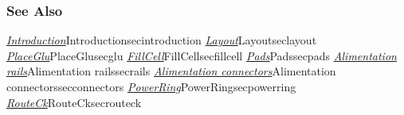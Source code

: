\subsubsection{See Also}

\hyperref[ref]{\emph{Introduction}}{}{Introduction}{secintroduction}
\hyperref[ref]{\emph{Layout}}{}{Layout}{seclayout}
\hyperref[ref]{\emph{PlaceGlu}}{}{PlaceGlu}{secglu}
\hyperref[ref]{\emph{FillCell}}{}{FillCell}{secfillcell}
\hyperref[ref]{\emph{Pads}}{}{Pads}{secpads}
\hyperref[ref]{\emph{Alimentation rails}}{}{Alimentation rails}{secrails}
\hyperref[ref]{\emph{Alimentation connectors}}{}{Alimentation connectors}{secconnectors}
\hyperref[ref]{\emph{PowerRing}}{}{PowerRing}{secpowerring}
\hyperref[ref]{\emph{RouteCk}}{}{RouteCk}{secrouteck}
